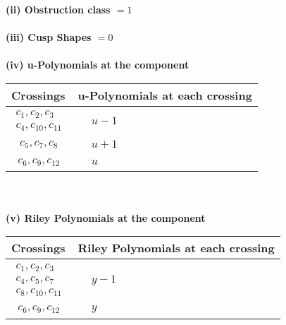 \documentclass[1p]{elsarticle_modified}
\theoremstyle{definition}
\begin{document}
\flushleft \textbf{(ii) Obstruction class $= 1$}\\~\\
\flushleft \textbf{(iii) Cusp Shapes $= 0$}\\~\\
\newpage\renewcommand{\arraystretch}{1}
\flushleft \textbf{(iv) u-Polynomials at the component}\newline \\
\begin{tabular}{m{50pt}|m{274pt}}
Crossings & \hspace{64pt}u-Polynomials at each crossing \\
\hline $$\begin{aligned}c_{1},c_{2},c_{3}\\c_{4},c_{10},c_{11}\end{aligned}$$&$\begin{aligned}
&u-1
\end{aligned}$\\
\hline $$\begin{aligned}c_{5},c_{7},c_{8}\end{aligned}$$&$\begin{aligned}
&u+1
\end{aligned}$\\
\hline $$\begin{aligned}c_{6},c_{9},c_{12}\end{aligned}$$&$\begin{aligned}
&u
\end{aligned}$\\
\hline
\end{tabular}\\~\\
\newpage\renewcommand{\arraystretch}{1}
\flushleft \textbf{(v) Riley Polynomials at the component}\newline \\
\begin{tabular}{m{50pt}|m{274pt}}
Crossings & \hspace{64pt}Riley Polynomials at each crossing \\
\hline $$\begin{aligned}c_{1},c_{2},c_{3}\\c_{4},c_{5},c_{7}\\c_{8},c_{10},c_{11}\end{aligned}$$&$\begin{aligned}
&y-1
\end{aligned}$\\
\hline $$\begin{aligned}c_{6},c_{9},c_{12}\end{aligned}$$&$\begin{aligned}
&y
\end{aligned}$\\
\hline
\end{tabular}\\~\\
\end{document}
